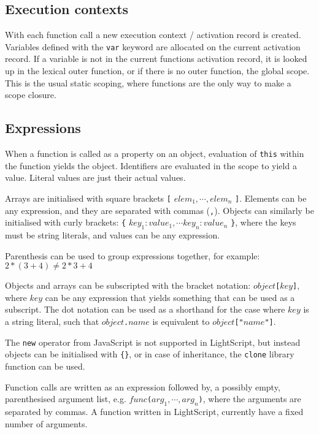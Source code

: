 \documentclass[11pt]{report}
\begin{document}
\subsection{Execution contexts}

With each function call a new execution context / activation record is created. 
Variables defined with the \verb|var| keyword are allocated on the current activation record. 
If a variable is not in the current functions activation record,
it is looked up in the lexical outer function, or if there is no outer function, the global scope.
This is the usual static scoping, where functions are the only way to make a scope closure.

\subsection{Expressions}

When a function is called as a property on an object, evaluation of \verb|this| within the function yields the object.  Identifiers are evaluated in the scope to yield a value. Literal values are just their actual values.

Arrays are initialised with square brackets \verb|[| $elem_1,\cdots,elem_n$ \verb|]|. Elements can be any expression, and they are separated with commas (\verb|,|). 
Objects can similarly be initialised with curly brackets: \verb|{| 
$key_1: value_1, \cdots key_n: value_n$ \verb|}|, where the keys must be string literals, and values can be any expression.

Parenthesis can be used to group expressions together, for example: $2 * (3 + 4) \neq 2 * 3 + 4$

Objects and arrays can be subscripted with the bracket notation: $object$\verb|[|$key$\verb|]|, where $key$ can be any expression that yields something that can be used as a subscript. The dot notation can be used as a shorthand for the case where $key$ is a string literal, such that $object$\verb|.|$name$ is equivalent to $object$\verb|["|$name$\verb|"]|.

The \verb|new| operator from JavaScript is not supported in LightScript, but instead objects can be initialised with \verb|{}|, or in case of inheritance, the \verb|clone| library function can be used.

Function calls are written as an expression followed by, a possibly empty, parenthesised argument list, e.g. $func$\verb|(|$arg_1,\cdots,arg_n$\verb|)|, where the arguments are separated by commas. 
A function written in LightScript, currently have a fixed number of arguments.
\end{document}
